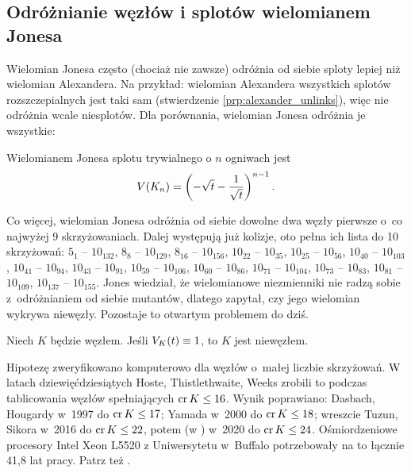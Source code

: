 
\subsection{Odróżnianie węzłów i splotów wielomianem Jonesa}
Wielomian Jonesa często (chociaż nie zawsze) odróżnia od siebie sploty lepiej niż wielomian Alexandera.
Na przykład: wielomian Alexandera wszystkich splotów rozszczepialnych jest taki sam (stwierdzenie \ref{prp:alexander_unlinks}), więc nie odróżnia wcale niesplotów.
Dla porównania, wielomian Jonesa odróżnia je wszystkie:

\begin{proposition}
\label{prp:jones_trivial_link}%
    Wielomianem Jonesa splotu trywialnego o $n$ ogniwach jest
    \begin{equation}
        V(K_n) = \left(-\sqrt{t} - \frac{1}{\sqrt {t}}\right)^{n-1}.
    \end{equation}
\end{proposition}

Co więcej, wielomian Jonesa odróżnia od siebie dowolne dwa węzły pierwsze o~co najwyżej 9 skrzyżowaniach.
Dalej występują już kolizje, oto pełna ich lista do 10 skrzyżowań:
$5_{1}$ -- $10_{132}$,
$8_{8}$ -- $10_{129}$,
$8_{16}$ -- $10_{156}$,
$10_{22}$ -- $10_{35}$,
$10_{25}$ -- $10_{56}$,
$10_{40}$ -- $10_{103}$,
$10_{41}$ -- $10_{94}$,
$10_{43}$ -- $10_{91}$,
$10_{59}$ -- $10_{106}$,
$10_{60}$ -- $10_{86}$,
$10_{71}$ -- $10_{104}$,
$10_{73}$ -- $10_{83}$,
$10_{81}$ -- $10_{109}$,
$10_{137}$ -- $10_{155}$.
Jones wiedział, że wielomianowe niezmienniki nie radzą sobie z~odróżnianiem od siebie mutantów, dlatego zapytał, czy jego wielomian wykrywa niewęzły.
Pozostaje to otwartym problemem do dziś.

\begin{conjecture}
%
\label{con:jones}%
    Niech $K$ będzie węzłem.
    Jeśli $V_K(t) \equiv 1$, to $K$ jest niewęzłem.
\end{conjecture}

Hipotezę zweryfikowano komputerowo dla węzłów o~małej liczbie skrzyżowań.
W latach dziewięćdziesiątych Hoste, Thistlethwaite, Weeks \cite{thistlethwaite98} zrobili to podczas tablicowania węzłów spełniających $\operatorname{cr} K \le 16$.
%
%
%
Wynik poprawiano:
Dasbach, Hougardy \cite{hougardy97} w~1997 do $\operatorname{cr} K \le 17$; 
%
%
Yamada \cite{yamada00} w~2000 do $\operatorname{cr} K \le 18$;
%
wreszcie Tuzun, Sikora \cite{tuzun18} w~2016 do $\operatorname{cr} K \le 22$,
%
%
potem (w \cite{tuzun21}) w~2020 do $\operatorname{cr} K \le 24$.
Ośmiordzeniowe procesory Intel Xeon L5520 z Uniwersytetu w~Buffalo potrzebowały na to łącznie 41,8 lat pracy.
Patrz też \cite[s. 381]{ohtsuki02}.

